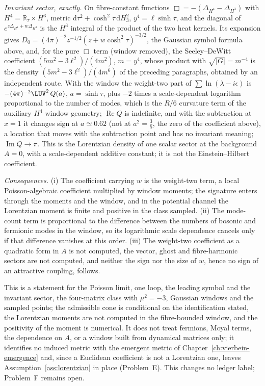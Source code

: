 \emph{Invariant sector, exactly.} On fibre-constant functions \(\Box=-(\Delta_{H^4}-\Delta_{H^3})\) with \(H^4=\mathbb R_\tau\times H^3\), metric \(\mathrm d\tau^2+\cosh^2\tau\,\mathrm dH_3^2\), \(y^4=\ell\sinh\tau\), and the diagonal of \(e^{z\Delta_{H^4}+w\Delta_{H^3}}\) is the \(H^3\) integral of the product of the two heat kernels. Its expansion gives \(D_0=(4\pi)^{-2}z^{-1/2}(z+w\cosh^2\tau)^{-3/2}\), the Gaussian symbol formula above, and, for the pure \(\Box\) term (window removed), the Seeley--DeWitt coefficient \((5m^2-3\ell^2)/(4m^2)\), \(m=y^4\), whose product with \(\sqrt{|G|}=m^{-4}\) is the density \((5m^2-3\ell^2)/(4m^6)\) of the preceding paragraphs, obtained by an independent route. With the window the weight-two part of \(\sum\ln(\lambda-i\epsilon)\) is \(-(4\pi)^{-2}\LUV^2\,Q(a)\), \(a=\sinh\tau\), plus \(-2\) times a scale-dependent logarithm proportional to the number of modes, which is the \(R/6\) curvature term of the auxiliary \(H^4\) window geometry; \(\operatorname{Re}Q\) is indefinite, and with the subtraction at \(x=1\) it changes sign at \(a\simeq0.62\) (not at \(a^2=\tfrac35\), the zero of the coefficient above), a location that moves with the subtraction point and has no invariant meaning; \(\operatorname{Im}Q\to\pi\). This is the Lorentzian density of one scalar sector at the background \(A=0\), with a scale-dependent additive constant; it is not the Einstein--Hilbert coefficient.

\emph{Consequences.} (i) The coefficient carrying \(w\) is the weight-two term, a local Poisson-algebraic coefficient multiplied by window moments; the signature enters through the moments and the window, and in the potential channel the Lorentzian moment is finite and positive in the class sampled. (ii) The mode-count term is proportional to the difference between the numbers of bosonic and fermionic modes in the window, so its logarithmic scale dependence cancels only if that difference vanishes at this order. (iii) The weight-two coefficient as a quadratic form in \(A\) is not computed, the vector, ghost and fibre-harmonic sectors are not computed, and neither the sign nor the size of \(w\), hence no sign of an attractive coupling, follows.

This is a statement for the Poisson limit, one loop, the leading symbol and the invariant sector, the four-matrix class with \(\mu^2=-3\), Gaussian windows and the sampled points; the admissible cone is conditional on the identification stated, the Lorentzian moments are not computed in the fibre-bounded window, and the positivity of the moment is numerical. It does not treat fermions, Moyal terms, the dependence on \(A\), or a window built from dynamical matrices only; it identifies no induced metric with the emergent metric of Chapter~\ref{ch:vierbein-emergence} and, since a Euclidean coefficient is not a Lorentzian one, leaves Assumption~\ref{ass:lorentzian} in place (Problem~E). This changes no ledger label; Problem~F remains open.

